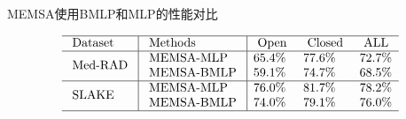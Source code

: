 %
\begin{table}
	\caption{\label{mlp2bmlp}MEMSA使用BMLP和MLP的性能对比}
	\centering
	\small %
	$$
	\begin{array}{l|l|lll}
	\hline \text { Dataset } & \text { Methods } & \text { Open } & \text { Closed } & \text { ALL } \\
	\hline \multirow{2}{*}{\text { Med-RAD }} & \text { MEMSA-MLP } & 65.4 \% & 77.6 \% & 72.7 \% \\
	& \text { MEMSA-BMLP } & 59.1 \% & 74.7 \% & 68.5 \% \\
	\hline \multirow{2}{*}{\text { SLAKE }} & \text { MEMSA-MLP } & 76.0 \% & 81.7 \% & 78.2 \% \\
	& \text { MEMSA-BMLP } & 74.0 \% & 79.1 \% & 76.0 \% \\
	\hline
	\end{array}
	$$
\end{table}

